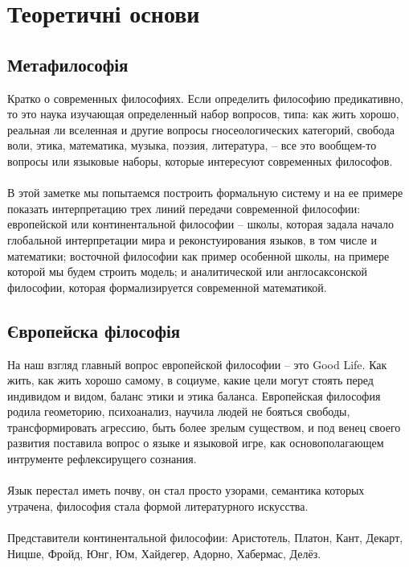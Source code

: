 \section{Теоретичні основи}

\subsection{Метафилософія}

Кратко о современных философиях. Если определить философию предикативно, то это наука изучающая определенный набор вопросов, типа: как жить хорошо, реальная ли вселенная и другие вопросы гносеологических категорий, свобода воли, этика, математика, музыка, поэзия, литература, -- все это вообщем-то вопросы или языковые наборы, которые интересуют современных философов.
\\
\\
В этой заметке мы попытаемся построить формальную систему и на ее примере показать интерпретацию трех линий передачи современной философии: европейской или континентальной философии -- школы, которая задала начало глобальной интерпретации мира и реконстуирования языков, в том числе и математики; восточной философии как пример особенной школы, на примере которой мы будем строить модель; и аналитической или англосаксонской философии, которая формализируется современной математикой.

\subsection{Європейска філософія}

На наш взгляд главный вопрос европейской философии -- это Good Life. Как жить, как жить хорошо самому, в социуме, какие цели могут стоять перед индивидом и видом, баланс этики и этика баланса. Европейская философия родила геометорию, психоанализ, научила людей не бояться свободы, трансформировать агрессию, быть более зрелым существом, и под венец своего развития поставила вопрос о языке и языковой игре, как основополагающем интрументе рефлексирущего сознания.
\\
\\
Язык перестал иметь почву, он стал просто узорами, семантика которых утрачена, философия стала формой литературного искусства.
\\
\\
Представители континентальной философии: Аристотель, Платон, Кант, Декарт, Ницше, Фройд, Юнг, Юм, Хайдегер, Адорно, Хабермас, Делёз.

